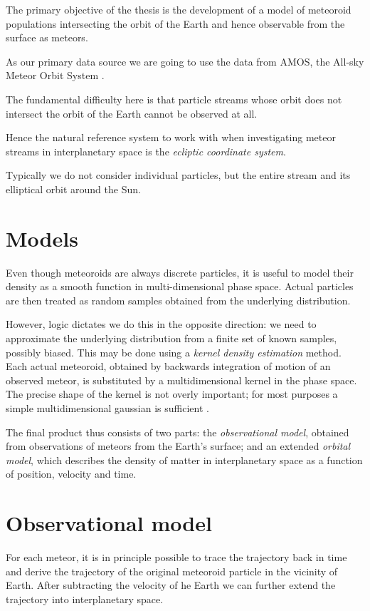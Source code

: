The primary objective of the thesis is the development of a model of meteoroid populations
intersecting the orbit of the Earth and hence observable from the surface as meteors.

As our primary data source we are going to use the data from AMOS, the All-sky Meteor Orbit System \citep{zigo+2013}.




The fundamental difficulty here is that particle streams whose orbit does not intersect the orbit of the Earth
cannot be observed at all.

Hence the natural reference system to work with when investigating meteor streams in interplanetary space
is the \emph{ecliptic coordinate system}.



Typically we do not consider individual particles, but the entire stream and its elliptical orbit around the Sun.

\section{Models}
    Even though meteoroids are always discrete particles, it is useful to model their density
    as a smooth function in multi-dimensional phase space.
    Actual particles are then treated as random samples obtained from the underlying distribution.

    However, logic dictates we do this in the opposite direction: we need to approximate
    the underlying distribution from a finite set of known samples, possibly biased.
    This may be done using a \emph{kernel density estimation} method.
    Each actual meteoroid, obtained by backwards integration of motion of an observed meteor,
    is substituted by a multidimensional kernel in the phase space. The precise shape of the kernel
    is not overly important; for most purposes a simple multidimensional gaussian is sufficient \cite{...}.

    The final product thus consists of two parts: the \emph{observational model},
    obtained from observations of meteors from the Earth's surface;
    and an extended \emph{orbital model}, which describes the density of matter
    in interplanetary space as a function of position, velocity and time.

\section{Observational model} \label{io}
    For each meteor, it is in principle possible to trace the trajectory back in time
    and derive the trajectory of the original meteoroid particle in the vicinity of Earth.
    After subtracting the velocity of he Earth we can further extend the trajectory
    into interplanetary space.

